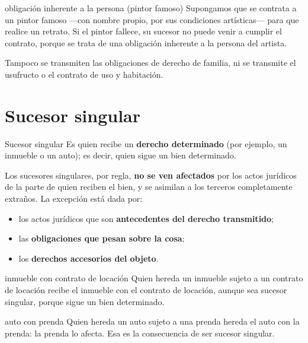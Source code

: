 \documentclass[12pt,oneside]{book}
\begin{document}
\begin{example}{obligación inherente a la persona (pintor famoso)}
Supongamos que se contrata a un pintor famoso —con nombre propio, por sus condiciones artísticas— para que realice un retrato. Si el pintor fallece, su sucesor no puede venir a cumplir el contrato, porque se trata de una obligación inherente a la persona del artista.
\end{example}

Tampoco se transmiten las obligaciones de derecho de familia, ni se transmite el usufructo o el contrato de uso y habitación.

\section{Sucesor singular}

\begin{definition}{Sucesor singular}
Es quien recibe un \textbf{derecho determinado} (por ejemplo, un inmueble o un auto); es decir, quien sigue un bien determinado.
\end{definition}

\begin{important}
Los sucesores singulares, por regla, \textbf{no se ven afectados} por los actos jurídicos de la parte de quien reciben el bien, y se asimilan a los terceros completamente extraños. La excepción está dada por:
\begin{itemize}
    \item los actos jurídicos que son \textbf{antecedentes del derecho transmitido};
    \item las \textbf{obligaciones que pesan sobre la cosa};
    \item los \textbf{derechos accesorios del objeto}.
\end{itemize}
\end{important}

\begin{example}{inmueble con contrato de locación}
Quien hereda un inmueble sujeto a un contrato de locación recibe el inmueble con el contrato de locación, aunque sea sucesor singular, porque sigue un bien determinado.
\end{example}

\begin{example}{auto con prenda}
Quien hereda un auto sujeto a una prenda hereda el auto con la prenda: la prenda lo afecta. Esa es la consecuencia de ser sucesor singular.
\end{example}
\end{document}
